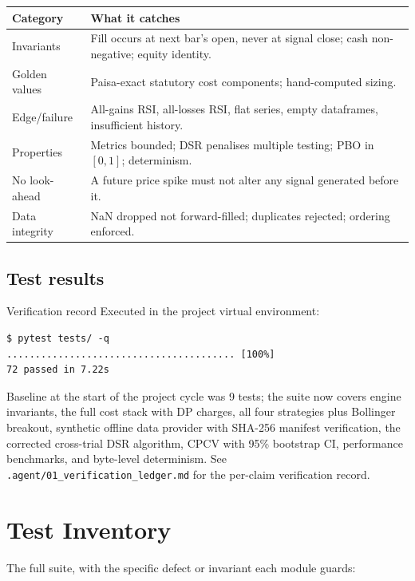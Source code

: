 \documentclass[12pt,a4paper,oneside]{report}
\begin{document}
\begin{center}
\begin{longtable}{@{}p{3.4cm}p{9.5cm}@{}}
\toprule
\textbf{Category} & \textbf{What it catches} \\
\midrule
\endfirsthead
Invariants & Fill occurs at next bar's open, never at signal close; cash non-negative; equity identity. \\
Golden values & Paisa-exact statutory cost components; hand-computed sizing. \\
Edge/failure & All-gains RSI, all-losses RSI, flat series, empty dataframes, insufficient history. \\
Properties & Metrics bounded; DSR penalises multiple testing; PBO in $[0,1]$; determinism. \\
No look-ahead & A future price spike must not alter any signal generated before it. \\
Data integrity & NaN dropped not forward-filled; duplicates rejected; ordering enforced. \\
\bottomrule
\end{longtable}
\end{center}

\subsection{Test results}

\begin{resultbox}{Verification record}
Executed in the project virtual environment:
\begin{verbatim}
$ pytest tests/ -q
........................................ [100%]
72 passed in 7.22s
\end{verbatim}

Baseline at the start of the project cycle was 9 tests; the suite now covers
engine invariants, the full cost stack with DP charges, all four strategies plus Bollinger breakout,
synthetic offline data provider with SHA-256 manifest verification, the corrected cross-trial DSR algorithm,
CPCV with 95\% bootstrap CI, performance benchmarks, and byte-level determinism. See
\texttt{.agent/01\_verification\_ledger.md} for the per-claim verification record.
\end{resultbox}

\section{Test Inventory}

The full suite, with the specific defect or invariant each module guards:
\end{document}
